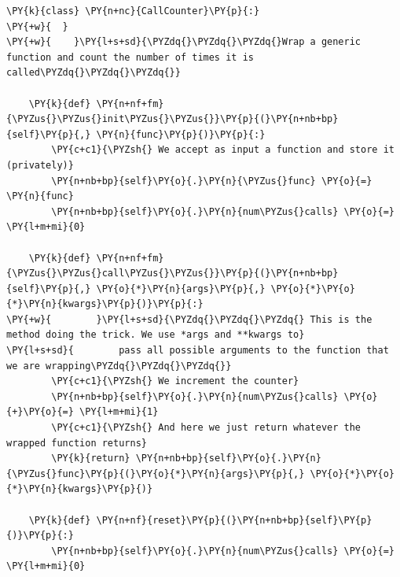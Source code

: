 \begin{Verbatim}[label=\makebox{\url{https://github.com/lucabaldini/cmepda/tree/master/slides/latex/snippets/callable.py}},commandchars=\\\{\}]
\PY{k}{class} \PY{n+nc}{CallCounter}\PY{p}{:}
\PY{+w}{  }
\PY{+w}{    }\PY{l+s+sd}{\PYZdq{}\PYZdq{}\PYZdq{}Wrap a generic function and count the number of times it is called\PYZdq{}\PYZdq{}\PYZdq{}}
    
    \PY{k}{def} \PY{n+nf+fm}{\PYZus{}\PYZus{}init\PYZus{}\PYZus{}}\PY{p}{(}\PY{n+nb+bp}{self}\PY{p}{,} \PY{n}{func}\PY{p}{)}\PY{p}{:}
        \PY{c+c1}{\PYZsh{} We accept as input a function and store it (privately)}
        \PY{n+nb+bp}{self}\PY{o}{.}\PY{n}{\PYZus{}func} \PY{o}{=} \PY{n}{func}
        \PY{n+nb+bp}{self}\PY{o}{.}\PY{n}{num\PYZus{}calls} \PY{o}{=} \PY{l+m+mi}{0}
    
    \PY{k}{def} \PY{n+nf+fm}{\PYZus{}\PYZus{}call\PYZus{}\PYZus{}}\PY{p}{(}\PY{n+nb+bp}{self}\PY{p}{,} \PY{o}{*}\PY{n}{args}\PY{p}{,} \PY{o}{*}\PY{o}{*}\PY{n}{kwargs}\PY{p}{)}\PY{p}{:}
\PY{+w}{        }\PY{l+s+sd}{\PYZdq{}\PYZdq{}\PYZdq{} This is the method doing the trick. We use *args and **kwargs to}
\PY{l+s+sd}{        pass all possible arguments to the function that we are wrapping\PYZdq{}\PYZdq{}\PYZdq{}}
        \PY{c+c1}{\PYZsh{} We increment the counter}
        \PY{n+nb+bp}{self}\PY{o}{.}\PY{n}{num\PYZus{}calls} \PY{o}{+}\PY{o}{=} \PY{l+m+mi}{1}
        \PY{c+c1}{\PYZsh{} And here we just return whatever the wrapped function returns}
        \PY{k}{return} \PY{n+nb+bp}{self}\PY{o}{.}\PY{n}{\PYZus{}func}\PY{p}{(}\PY{o}{*}\PY{n}{args}\PY{p}{,} \PY{o}{*}\PY{o}{*}\PY{n}{kwargs}\PY{p}{)}
    
    \PY{k}{def} \PY{n+nf}{reset}\PY{p}{(}\PY{n+nb+bp}{self}\PY{p}{)}\PY{p}{:}
        \PY{n+nb+bp}{self}\PY{o}{.}\PY{n}{num\PYZus{}calls} \PY{o}{=} \PY{l+m+mi}{0}
\end{Verbatim}
